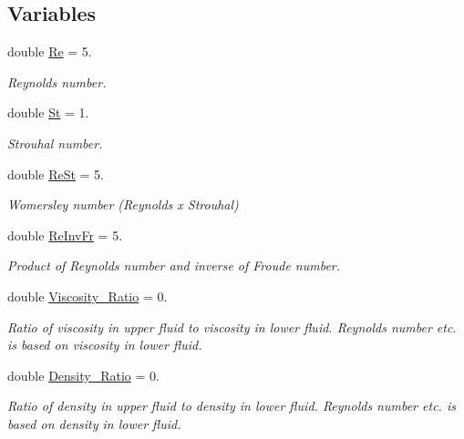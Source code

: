 \subsection*{Variables}
\begin{DoxyCompactItemize}
\item 
double \hyperlink{namespaceGlobal__Physical__Variables_ab814e627d2eb5bc50318879d19ab16b9}{Re} = 5.
\begin{DoxyCompactList}\small\item\em Reynolds number. \end{DoxyCompactList}\item 
double \hyperlink{namespaceGlobal__Physical__Variables_a4b6ef72bd221361c37f5b9a4a6899afc}{St} = 1.
\begin{DoxyCompactList}\small\item\em Strouhal number. \end{DoxyCompactList}\item 
double \hyperlink{namespaceGlobal__Physical__Variables_a085ee4bf968ffdd01a41b8c41864f907}{Re\+St} = 5.
\begin{DoxyCompactList}\small\item\em Womersley number (Reynolds x Strouhal) \end{DoxyCompactList}\item 
double \hyperlink{namespaceGlobal__Physical__Variables_aa6286f02b476912dd7550eced538331a}{Re\+Inv\+Fr} = 5.
\begin{DoxyCompactList}\small\item\em Product of Reynolds number and inverse of Froude number. \end{DoxyCompactList}\item 
double \hyperlink{namespaceGlobal__Physical__Variables_adb51428300a01b19395c43c0d3586d6f}{Viscosity\+\_\+\+Ratio} = 0.
\begin{DoxyCompactList}\small\item\em Ratio of viscosity in upper fluid to viscosity in lower fluid. Reynolds number etc. is based on viscosity in lower fluid. \end{DoxyCompactList}\item 
double \hyperlink{namespaceGlobal__Physical__Variables_a80a34b6dfb7e1501966b8d6c7501e718}{Density\+\_\+\+Ratio} = 0.
\begin{DoxyCompactList}\small\item\em Ratio of density in upper fluid to density in lower fluid. Reynolds number etc. is based on density in lower fluid. \end{DoxyCompactList}\item 

\end{DoxyCompactItemize}
